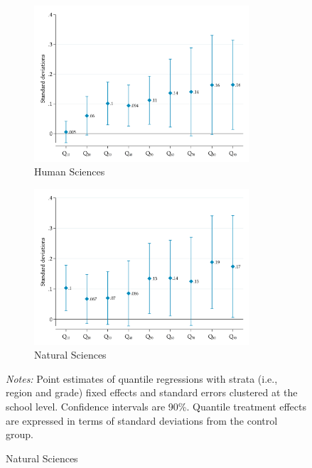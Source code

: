 \documentclass[11pt,a4paper]{article}
\begin{document}
\begin{figure}[ht!]
		\begin{subfigure}{0.5\textwidth}
			\centering
			\caption{Human Sciences}
			\label{fig:qreg_CH_grade6}
			\includegraphics[width=8cm]{DataWork/Output/Figures/figC1c-qreg_CH_grade6.png}
		\end{subfigure}%
		\begin{subfigure}{0.5\textwidth}
			\centering
			\caption{Natural Sciences}
			\label{fig:qreg_CN_grade6}
			\includegraphics[width=8cm]{DataWork/Output/Figures/figC1d-qreg_CN_grade6}
		\end{subfigure}
		
		\vspace{1em}
		
		\justifying
		\noindent
		\small{\textit{Notes:} Point estimates of quantile regressions with strata (i.e., region and grade) fixed effects and standard errors clustered at the school level. Confidence intervals are 90\%. Quantile treatment effects are expressed in terms of standard deviations from the control group.}
	\end{figure}
	\vfill
	
\end{document}
